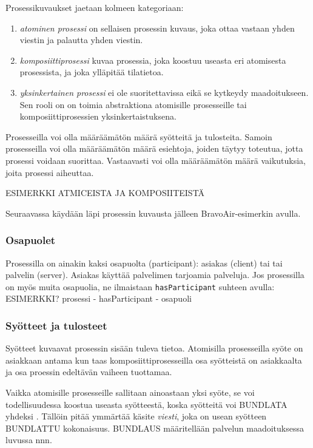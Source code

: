 \documentclass[finnish]{tktltiki2}
\theoremstyle{definition}
\theoremstyle{remark}
\begin{document}
Prosessikuvaukset jaetaan kolmeen kategoriaan\cite{OWLS}:
\begin{enumerate}
\item \textit{atominen prosessi} on sellaisen prosessin kuvaus, joka ottaa vastaan yhden viestin ja palautta yhden viestin. 
\item \textit{komposiittiprosessi} kuvaa prosessia, joka koostuu useasta eri atomisesta prosessista, ja joka ylläpitää tilatietoa. 
\item \textit{yksinkertainen prosessi} ei ole suoritettavissa eikä se kytkeydy maadoitukseen. Sen rooli on on toimia abstraktiona atomisille prosesseille tai komposiittiprosessien yksinkertaistuksena. 
\end{enumerate}

Prosesseilla voi olla määräämätön määrä syötteitä ja tulosteita. Samoin prosesseilla voi olla määräämätön määrä esiehtoja, joiden täytyy toteutua, jotta prosessi voidaan suorittaa. Vastaavasti voi olla määräämätön määrä vaikutuksia, joita prosessi aiheuttaa\cite{OWLS}.

ESIMERKKI ATMICEISTA JA KOMPOSIITEISTÄ

Seuraavassa käydään läpi prosessin kuvausta jälleen BravoAir-esimerkin\cite{daml} avulla.

\subsubsection{Osapuolet}

Prosessilla on ainakin kaksi osapuolta (participant): asiakas (client) tai tai palvelin (server). Asiakas käyttää palvelimen tarjoamia palveluja\cite{OWLS}.
Jos prosessilla on myös muita osapuolia, ne ilmaistaan \texttt{hasParticipant} suhteen avulla:
ESIMERKKI? prosessi - hasParticipant - osapuoli

\subsubsection{Syötteet ja tulosteet}

Syötteet kuvaavat prosessin sisään tuleva tietoa\cite{OWLS}. Atomisilla prosesseilla syöte on asiakkaan antama kun taas komposiittiprosesseilla osa syötteistä on asiakkaalta ja osa proessin edeltävän vaiheen tuottamaa. 

Vaikka atomisille prosesseille sallitaan ainoastaan yksi syöte, se voi todellisuudessa koostua useasta syötteestä, koska syötteitä voi BUNDLATA yhdeksi \cite{OWLS}. Tällöin pitää ymmärtää käsite \textit{viesti}, joka on usean syötteen BUNDLATTU kokonaisuus. BUNDLAUS määritellään palvelun maadoituksessa luvussa nnn. 
\end{document}
